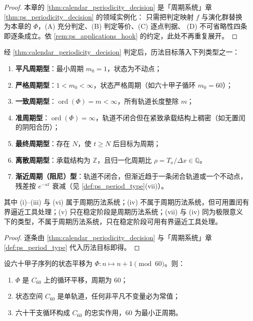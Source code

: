 \begin{proof}
本章的 \cref{thm:calendar_periodicity_decision} 是「周期系统」章 \cref{thm:ps_periodicity_decision} 的领域实例化：
只需把判定映射 $f$ 与演化群替换为本章的 $\Phi$，(A) 充分判定、(B) 判定等价、(C) 逐点判据、
(D) 不可省略性四条即逐条成立。依 \cref{rem:ps_applications_hook} 的约定，此处不再重复展开。
\end{proof}

\begin{corollary}[历法周期类型]\label{cor:calendar_period_type}
经 \cref{thm:calendar_periodicity_decision} 判定后，历法目标落入下列类型之一：
\begin{enumerate}[label=(\roman*)]
    \item \textbf{平凡周期型}：最小周期 \(m_0=1\)，状态为不动点；
    \item \textbf{严格周期型}：\(1<m_0<\infty\)，状态严格周期（如六十甲子循环 \(m_0=60\)）；
    \item \textbf{一致周期型}：\(\operatorname{ord}(\Phi)=m<\infty\)，所有轨道长度整除 \(m\)；
    \item \textbf{准周期型}：\(\operatorname{ord}(\Phi)=\infty\)，轨道不闭合但在紧致承载结构上稠密（如无置闰的阴阳合历）；
    \item \textbf{最终周期型}：存在 \(N\)，使 \(t\ge N\) 后目标为周期；
    \item \textbf{离散周期型}：承载结构为 \(\mathbb Z\)，且归一化周期比 \(\rho=T_x/\Delta x\in\mathbb Q\)。
    \item \textbf{渐近周期（阻尼）型}：轨道不闭合，但渐近趋于一条闭合轨道或一个不动点，残差按 \(e^{-\kappa t}\) 衰减（见 \cref{def:ps_period_type}(vii)）。
\end{enumerate}
其中 (i)--(iii) 与 (vi) 属于周期历法系统；(iv) 不属于周期历法系统，但可用置闰有界逼近工具处理；(v) 只在稳定阶段是周期历法系统；(vii) 与 (iv) 同为极限意义下的类型，不属于周期历法系统，只在稳定阶段可用有界逼近工具处理。
\end{corollary}

\begin{proof}
逐条由 \cref{thm:calendar_periodicity_decision} 与「周期系统」章 \cref{def:ps_period_type} 代入历法目标即得。
\end{proof}

\begin{lemma}[干支序列的周期判定]\label{lem:ganzhi_period}
设六十甲子序列的状态平移为 \(\Phi:n\mapsto n+1\pmod{60}\)。则：
\begin{enumerate}[label=(\roman*)]
    \item \(\Phi\) 是 \(C_{60}\) 上的循环平移，周期为 \(60\)；
    \item 状态空间 \(C_{60}\) 是单轨道，任何非平凡不变量必为常值；
    \item 六十干支循环构成 \(C_{60}\) 的忠实作用，\(60\) 为最小正周期。
\end{enumerate}
\end{lemma}

